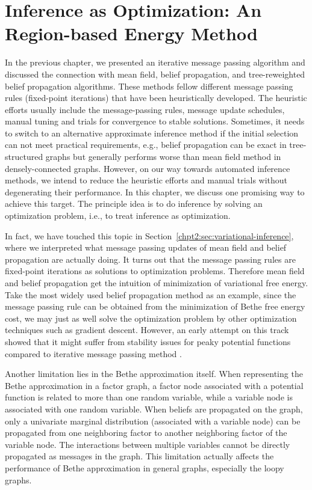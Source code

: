 \chapter{Inference as Optimization: An Region-based Energy Method}
\label{chapter4}
In the previous chapter, we presented an iterative message passing algorithm and discussed the connection with mean field, belief propagation, and tree-reweighted belief propagation algorithms. These methods fellow different message passing rules (fixed-point iterations) that have been heuristically developed.
The heuristic efforts usually include the message-passing rules, message update schedules, manual tuning and trials for convergence to stable solutions. Sometimes, it needs to switch to an alternative approximate inference method if the initial selection can not meet practical requirements, e.g., belief propagation can be exact in tree-structured graphs but generally performs worse than mean field method in densely-connected graphs.
However, on our way towards automated inference methods, we intend to reduce the heuristic efforts and manual trials without degenerating their performance. In this chapter, we discuss one promising way to achieve this target. The principle idea is to do inference by solving an optimization problem, i.e., to treat inference as optimization.

In fact, we have touched this topic in Section~\ref{chpt2:sec:variational-inference}, where we interpreted what message passing updates of mean field and belief propagation are actually doing. It turns out that the message passing rules are fixed-point iterations as solutions to optimization problems. Therefore mean field and belief propagation get the intuition of minimization of variational free energy. Take the most widely used belief propagation method as an example, since the message passing rule can be obtained from the minimization of Bethe free energy cost, we may just as well solve the optimization problem by other optimization techniques such as gradient descent. However, an early attempt on this track showed that it might suffer from stability issues for peaky potential functions compared to iterative message passing method \cite{welling2001belief}.


Another limitation lies in the Bethe approximation itself. When representing the Bethe approximation in a factor graph, a factor node associated with a potential function is related to more than one random variable, while a variable node is associated with one random variable. When beliefs are propagated on the graph, only a univariate marginal distribution (associated with a variable node) can be propagated from one neighboring factor to another neighboring factor of the variable node. The interactions between multiple variables cannot be directly propagated as messages in the graph. This limitation actually affects the performance of Bethe approximation in general graphs, especially the loopy graphs.

